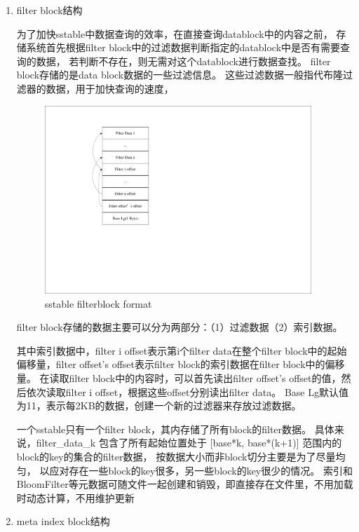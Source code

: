 \begin{enumerate}
\begin{enumerate}
	\item filter block结构
	
	为了加快sstable中数据查询的效率，在直接查询datablock中的内容之前，
	存储系统首先根据filter block中的过滤数据判断指定的datablock中是否有需要查询的数据，
	若判断不存在，则无需对这个datablock进行数据查找。
	filter block存储的是data block数据的一些过滤信息。
	这些过滤数据一般指代布隆过滤器的数据，用于加快查询的速度，
	
	\begin{figure}[H]
		\centering
		\includegraphics[width=0.95\textwidth]{pdf/filterblock_format.pdf}
		\caption{sstable filterblock format}
		\label{sstable_filterblock_format}
	\end{figure}

	filter block存储的数据主要可以分为两部分：（1）过滤数据（2）索引数据。
	
	其中索引数据中，filter i offset表示第i个filter data在整个filter block中的起始偏移量，filter offset's offset表示filter block的索引数据在filter block中的偏移量。
	在读取filter block中的内容时，可以首先读出filter offset's offset的值，然后依次读取filter i offset，根据这些offset分别读出filter data。
	Base Lg默认值为11，表示每2KB的数据，创建一个新的过滤器来存放过滤数据。
	
	一个sstable只有一个filter block，其内存储了所有block的filter数据。
	具体来说，filter\_data\_k 包含了所有起始位置处于 [base*k, base*(k+1)]
	范围内的block的key的集合的filter数据，
	按数据大小而非block切分主要是为了尽量均匀，
	以应对存在一些block的key很多，另一些block的key很少的情况。
	索引和BloomFilter等元数据可随文件一起创建和销毁，即直接存在文件里，不用加载时动态计算，不用维护更新
				
	\item meta index block结构
	

\end{enumerate}
\end{enumerate}
